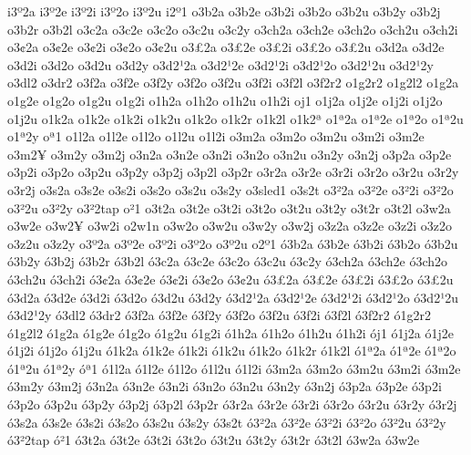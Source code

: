 {i3^^ba2a
i3^^ba2e
i3^^ba2i
i3^^ba2o
i3^^ba2u
i2^^ba1                       
o3b2a 
o3b2e 
o3b2i 
o3b2o
o3b2u
o3b2y
o3b2j
o3b2r
o3b2l
o3c2a
o3c2e
o3c2o
o3c2u
o3c2y
o3ch2a
o3ch2e
o3ch2o
o3ch2u
o3ch2i
o3^^a22a
o3^^a22e
o3^^a22i
o3^^a22o
o3^^a22u
o3^^a32a
o3^^a32e
o3^^a32i
o3^^a32o
o3^^a32u
o3d2a
o3d2e
o3d2i
o3d2o
o3d2u
o3d2y
o3d2^^b92a
o3d2^^b92e
o3d2^^b92i
o3d2^^b92o
o3d2^^b92u
o3d2^^b92y
o3dl2
o3dr2
o3f2a
o3f2e
o3f2y
o3f2o
o3f2u
o3f2i
o3f2l
o3f2r2
o1g2r2
o1g2l2
o1g2a
o1g2e
o1g2o
o1g2u
o1g2i
o1h2a
o1h2o
o1h2u
o1h2i
oj1
o1j2a
o1j2e
o1j2i
o1j2o
o1j2u
o1k2a
o1k2e
o1k2i
o1k2u
o1k2o
o1k2r
o1k2l
o1k2^^aa
o1^^aa2a
o1^^aa2e
o1^^aa2o
o1^^aa2u
o1^^aa2y
o^^aa1
o1l2a
o1l2e
o1l2o
o1l2u
o1l2i
o3m2a
o3m2o
o3m2u
o3m2i
o3m2e
o3m2^^a5
o3m2y
o3m2j
o3n2a
o3n2e
o3n2i
o3n2o
o3n2u
o3n2y
o3n2j
o3p2a
o3p2e
o3p2i
o3p2o
o3p2u
o3p2y
o3p2j
o3p2l
o3p2r
o3r2a
o3r2e
o3r2i
o3r2o
o3r2u
o3r2y
o3r2j
o3s2a
o3s2e
o3s2i
o3s2o
o3s2u
o3s2y
o3sled1
o3s2t
o3^^b22a
o3^^b22e
o3^^b22i
o3^^b22o
o3^^b22u
o3^^b22y
o3^^b22tap
o^^b21
o3t2a
o3t2e
o3t2i
o3t2o
o3t2u
o3t2y
o3t2r
o3t2l
o3w2a
o3w2e
o3w2^^a5
o3w2i
o2w1n
o3w2o
o3w2u
o3w2y
o3w2j
o3z2a
o3z2e
o3z2i
o3z2o
o3z2u
o3z2y
o3^^ba2a
o3^^ba2e
o3^^ba2i
o3^^ba2o
o3^^ba2u
o2^^ba1                       
^^f33b2a 
^^f33b2e 
^^f33b2i 
^^f33b2o
^^f33b2u
^^f33b2y
^^f33b2j
^^f33b2r
^^f33b2l
^^f33c2a
^^f33c2e
^^f33c2o
^^f33c2u
^^f33c2y
^^f33ch2a
^^f33ch2e
^^f33ch2o
^^f33ch2u
^^f33ch2i
^^f33^^a22a
^^f33^^a22e
^^f33^^a22i
^^f33^^a22o
^^f33^^a22u
^^f33^^a32a
^^f33^^a32e
^^f33^^a32i
^^f33^^a32o
^^f33^^a32u
^^f33d2a
^^f33d2e
^^f33d2i
^^f33d2o
^^f33d2u
^^f33d2y
^^f33d2^^b92a
^^f33d2^^b92e
^^f33d2^^b92i
^^f33d2^^b92o
^^f33d2^^b92u
^^f33d2^^b92y
^^f33dl2
^^f33dr2
^^f33f2a
^^f33f2e
^^f33f2y
^^f33f2o
^^f33f2u
^^f33f2i
^^f33f2l
^^f33f2r2
^^f31g2r2
^^f31g2l2
^^f31g2a
^^f31g2e
^^f31g2o
^^f31g2u
^^f31g2i
^^f31h2a
^^f31h2o
^^f31h2u
^^f31h2i
^^f3j1
^^f31j2a
^^f31j2e
^^f31j2i
^^f31j2o
^^f31j2u
^^f31k2a
^^f31k2e
^^f31k2i
^^f31k2u
^^f31k2o
^^f31k2r
^^f31k2l
^^f31^^aa2a
^^f31^^aa2e
^^f31^^aa2o
^^f31^^aa2u
^^f31^^aa2y
^^f3^^aa1
^^f31l2a
^^f31l2e
^^f31l2o
^^f31l2u
^^f31l2i
^^f33m2a
^^f33m2o
^^f33m2u
^^f33m2i
^^f33m2e
^^f33m2y
^^f33m2j
^^f33n2a
^^f33n2e
^^f33n2i
^^f33n2o
^^f33n2u
^^f33n2y
^^f33n2j
^^f33p2a
^^f33p2e
^^f33p2i
^^f33p2o
^^f33p2u
^^f33p2y
^^f33p2j
^^f33p2l
^^f33p2r
^^f33r2a
^^f33r2e
^^f33r2i
^^f33r2o
^^f33r2u
^^f33r2y
^^f33r2j
^^f33s2a
^^f33s2e
^^f33s2i
^^f33s2o
^^f33s2u
^^f33s2y
^^f33s2t
^^f33^^b22a
^^f33^^b22e
^^f33^^b22i
^^f33^^b22o
^^f33^^b22u
^^f33^^b22y
^^f33^^b22tap
^^f3^^b21
^^f33t2a
^^f33t2e
^^f33t2i
^^f33t2o
^^f33t2u
^^f33t2y
^^f33t2r
^^f33t2l
^^f33w2a
^^f33w2e
}

